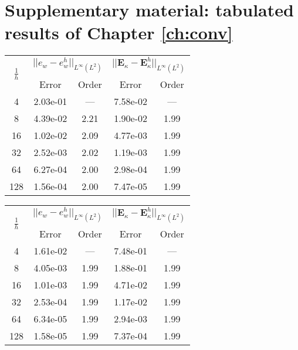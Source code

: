 \chapter{Supplementary material: tabulated results of Chapter \ref{ch:conv}}

\begin{table}[hp]
	\centering
	\begin{tabular}{ccccc}
		\hline 
		\multirow{2}{*}{$\frac{1}{h}$} & \multicolumn{2}{c}{$||e_w - e_w^h||_{L^{\infty}(L^2)}$}  & \multicolumn{2}{c}{$||\bm{E}_\kappa - \bm{E}_\kappa^h||_{L^{\infty}(L^2)}$}   \\ 
		& Error & Order  & Error & Order  \\
		\hline 
		4  & 2.03e-01 & ---  & 7.58e-02 & ---  \\ 
		8  & 4.39e-02 & 2.21 & 1.90e-02 & 1.99 \\ 
		16 & 1.02e-02 & 2.09 & 4.77e-03 & 1.99 \\ 
		32 & 2.52e-03 & 2.02 & 1.19e-03 & 1.99 \\ 
		64 & 6.27e-04 & 2.00 & 2.98e-04 & 1.99 \\ 
		128& 1.56e-04 & 2.00 & 7.47e-05 & 1.99 \\
		\hline 
	\end{tabular} 
	\captionsetup{width=0.95\linewidth}
	\vspace{1mm}
	\label{tab:resebHerDG1}
\end{table}	


\begin{table}[hp]
	\centering
	\begin{tabular}{ccccc}
		\hline 
		\multirow{2}{*}{$\frac{1}{h}$} & \multicolumn{2}{c}{$||e_w - e_w^h||_{L^{\infty}(L^2)}$}  & \multicolumn{2}{c}{$||\bm{E}_\kappa - \bm{E}_\kappa^h||_{L^{\infty}(L^2)}$}   \\ 
		& Error & Order  & Error & Order  \\
		\hline 
		4  & 1.61e-02 & ---  & 7.48e-01 & ---  \\ 
		8  & 4.05e-03 & 1.99 & 1.88e-01 & 1.99 \\ 
		16 & 1.01e-03 & 1.99 & 4.71e-02 & 1.99 \\ 
		32 & 2.53e-04 & 1.99 & 1.17e-02 & 1.99 \\ 
		64 & 6.34e-05 & 1.99 & 2.94e-03 & 1.99 \\ 
		128& 1.58e-05 & 1.99 & 7.37e-04 & 1.99 \\
		\hline 
	\end{tabular} 
	\captionsetup{width=0.95\linewidth}
	\vspace{1mm}
	\label{tab:resebDG1Her}
\end{table}	


